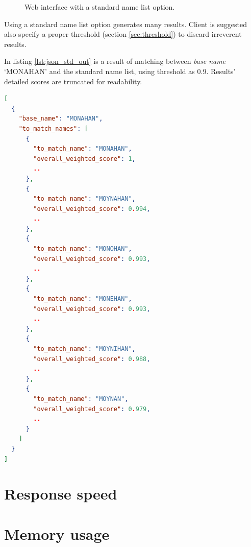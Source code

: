 \begin{figure}[H]
\centering
\captionsetup{justification=centering}
\caption{Web interface with a standard name list option.}
\label{fig:wi_std}
\end{figure}

Using a standard name list option generates many results.
Client is suggested also specify a proper threshold (section \ref{sec:threshold})
to discard irreverent results.

In listing \ref{lst:json_std_out} is a result of matching between
\emph{base name} `MONAHAN' and the standard name list, using threshold as 0.9.
Results' detailed scores are truncated for readability.

\begin{minipage}{\linewidth}
  \begin{lstlisting}[language={json}, label={lst:json_std_out}, caption={Results of matching \emph{base name} `MONAHAN' with a standard name list.}]
[
  {
    "base_name": "MONAHAN",
    "to_match_names": [
      {
        "to_match_name": "MONAHAN",
        "overall_weighted_score": 1,
        ..
      },
      {
        "to_match_name": "MOYNAHAN",
        "overall_weighted_score": 0.994,
        ..
      },
      {
        "to_match_name": "MONOHAN",
        "overall_weighted_score": 0.993,
        ..
      },
      {
        "to_match_name": "MONEHAN",
        "overall_weighted_score": 0.993,
        ..
      },
      {
        "to_match_name": "MOYNIHAN",
        "overall_weighted_score": 0.988,
        ..
      },
      {
        "to_match_name": "MOYNAN",
        "overall_weighted_score": 0.979,
        ..
      }
    ]
  }
]
\end{lstlisting}
\end{minipage}

\section{Response speed}

\section{Memory usage}

